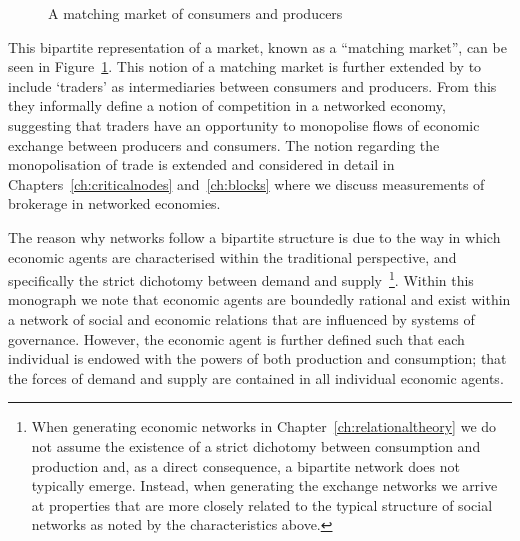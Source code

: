\begin{figure}[t]
\label{fig:bipartiteexchange}
\begin{center}
\end{center}
\caption{A matching market of consumers and producers}
\end{figure}

This bipartite representation of a market, known as a ``matching market'', can be seen in Figure~\ref{fig:bipartiteexchange}. This notion of a matching market is further extended by \citet{EasleyKleinberg2010} to include `traders' as intermediaries between consumers and producers. From this they informally define a notion of competition in a networked economy, suggesting that traders have an opportunity to monopolise flows of economic exchange between producers and consumers. The notion regarding the monopolisation of trade is extended and considered in detail in Chapters~\ref{ch:criticalnodes} and~\ref{ch:blocks} where we discuss measurements of brokerage in networked economies.

The reason why networks follow a bipartite structure is due to the way in which economic agents are characterised within the traditional perspective, and specifically the strict dichotomy between demand and supply~\footnote{When generating economic networks in Chapter~\ref{ch:relationaltheory} we do not assume the existence of a strict dichotomy between consumption and production and, as a direct consequence, a bipartite network does not typically emerge. Instead, when generating the exchange networks we arrive at properties that are more closely related to the typical structure of social networks as noted by the characteristics above.}. Within this monograph we note that economic agents are boundedly rational and exist within a network of social and economic relations that are influenced by systems of governance. However, the economic agent is further defined such that each individual is endowed with the powers of both production and consumption; that the forces of demand and supply are contained in all individual economic agents.

